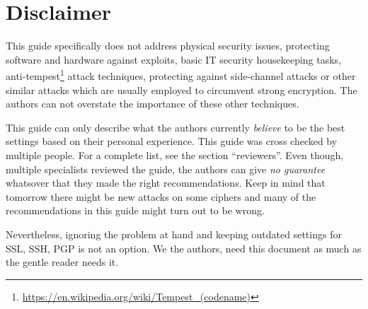 \section{Disclaimer}
This guide specifically does not address physical security issues, protecting software and hardware against exploits, basic IT security housekeeping tasks, anti-tempest\footnote{\url{https://en.wikipedia.org/wiki/Tempest\_(codename)}} attack techniques, protecting against side-channel attacks or other similar attacks which are usually employed to circumvent strong encryption. The authors can not overstate the importance of these other techniques. 

This guide can only describe what the authors currently \emph{believe} to be the best settings based on their personal experience. This guide was cross checked by multiple people. For a complete list, see the section ``reviewers''. Even though, multiple specialists reviewed the guide, the authors can give \emph{no guarantee} whatsover that they made the right recommendations. Keep in mind that tomorrow there might be new attacks on some ciphers and many of the recommendations in this guide might turn out to be wrong.



Nevertheless, ignoring the problem at hand and keeping outdated settings for SSL, SSH, PGP is not an option. We the authors, need this document as much as the gentle reader needs it.

